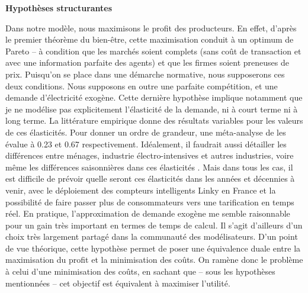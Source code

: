 \textbf{Hypothèses structurantes}

Dans notre modèle, nous maximisons le profit des producteurs. En effet, d’après le premier théorème du bien-être, cette maximisation conduit à un optimum de Pareto – à condition que les marchés soient complets (sans coût de transaction et avec une information parfaite des agents) et que les firmes soient preneuses de prix. Puisqu’on se place dans une démarche normative, nous supposerons ces deux conditions. 
Nous supposons en outre une parfaite compétition, et une demande d’électricité exogène. Cette dernière hypothèse implique notamment que je ne modélise pas explicitement l'élasticité de la demande, ni à court terme ni à long terme. La littérature empirique donne des résultats variables pour les valeurs de ces élasticités. Pour donner un ordre de grandeur, une méta-analyse de \citet{Labandeira2016} les évalue à 0.23 et 0.67 respectivement. Idéalement, il faudrait aussi détailler les différences entre ménages, industrie électro-intensives et autres industries, voire même les différences saisonnières dans ces élasticités \citep{Fan2011}. Mais dans tous les cas, il est difficile de prévoir quelle seront ces élasticités dans les années et décennies à venir, avec le déploiement des compteurs intelligents Linky en France et la possibilité de faire passer plus de consommateurs vers une tarification en temps réel.
En pratique, l'approximation de demande exogène me semble raisonnable pour un gain très important en termes de temps de calcul. Il s'agit d'ailleurs d'un choix très largement partagé dans la communauté des modélisateurs. D’un point de vue théorique, cette hypothèse permet de poser une équivalence duale entre la maximisation du profit et la minimisation des coûts. 
On ramène donc le problème à celui d’une minimisation des coûts, en sachant que – sous les hypothèses mentionnées – cet objectif est équivalent à maximiser l’utilité.

